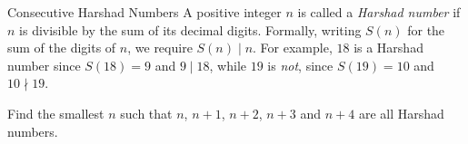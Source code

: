 \begin{problem}{Consecutive Harshad Numbers}
    A positive integer \(n\) is called a \textit{Harshad number} if \(n\) is divisible by the sum of its decimal digits. Formally, writing \(S(n)\) for the sum of the digits of \(n\), we require \(S(n) \mid n\). For example, \(18\) is a Harshad number since \(S(18) = 9\) and \(9 \mid 18\), while \(19\) is \emph{not}, since \(S(19) = 10\) and \(10 \nmid 19\).

    Find the smallest \(n\) such that \(n\), \(n+1\), \(n+2\), \(n+3\) and \(n+4\) are all Harshad numbers.

    
\end{problem}
